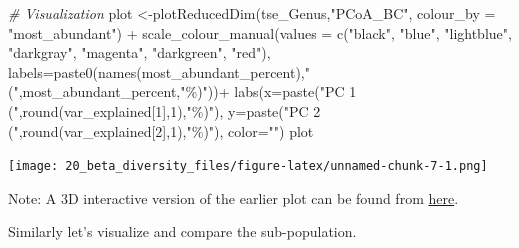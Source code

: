 \documentclass[
]{book}
\newenvironment{Shaded}{\begin{snugshade}}{\end{snugshade}}
\newcommand{\AttributeTok}[1]{\textcolor[rgb]{0.77,0.63,0.00}{#1}}
\newcommand{\CommentTok}[1]{\textcolor[rgb]{0.56,0.35,0.01}{\textit{#1}}}
\newcommand{\DecValTok}[1]{\textcolor[rgb]{0.00,0.00,0.81}{#1}}
\newcommand{\FunctionTok}[1]{\textcolor[rgb]{0.00,0.00,0.00}{#1}}
\newcommand{\NormalTok}[1]{#1}
\newcommand{\OtherTok}[1]{\textcolor[rgb]{0.56,0.35,0.01}{#1}}
\newcommand{\SpecialCharTok}[1]{\textcolor[rgb]{0.00,0.00,0.00}{#1}}
\newcommand{\StringTok}[1]{\textcolor[rgb]{0.31,0.60,0.02}{#1}}
\begin{document}
\begin{Shaded}
\begin{Highlighting}[]
\CommentTok{\# Visualization}
\NormalTok{plot }\OtherTok{\textless{}{-}}\FunctionTok{plotReducedDim}\NormalTok{(tse\_Genus,}\StringTok{"PCoA\_BC"}\NormalTok{, }\AttributeTok{colour\_by =} \StringTok{"most\_abundant"}\NormalTok{) }\SpecialCharTok{+}
  \FunctionTok{scale\_colour\_manual}\NormalTok{(}\AttributeTok{values =} \FunctionTok{c}\NormalTok{(}\StringTok{"black"}\NormalTok{, }\StringTok{"blue"}\NormalTok{, }\StringTok{"lightblue"}\NormalTok{, }\StringTok{"darkgray"}\NormalTok{, }\StringTok{"magenta"}\NormalTok{, }\StringTok{"darkgreen"}\NormalTok{, }\StringTok{"red"}\NormalTok{),}
                      \AttributeTok{labels=}\FunctionTok{paste0}\NormalTok{(}\FunctionTok{names}\NormalTok{(most\_abundant\_percent),}\StringTok{"("}\NormalTok{,most\_abundant\_percent,}\StringTok{"\%)"}\NormalTok{))}\SpecialCharTok{+}
  \FunctionTok{labs}\NormalTok{(}\AttributeTok{x=}\FunctionTok{paste}\NormalTok{(}\StringTok{"PC 1 ("}\NormalTok{,}\FunctionTok{round}\NormalTok{(var\_explained[}\DecValTok{1}\NormalTok{],}\DecValTok{1}\NormalTok{),}\StringTok{"\%)"}\NormalTok{),}
       \AttributeTok{y=}\FunctionTok{paste}\NormalTok{(}\StringTok{"PC 2 ("}\NormalTok{,}\FunctionTok{round}\NormalTok{(var\_explained[}\DecValTok{2}\NormalTok{],}\DecValTok{1}\NormalTok{),}\StringTok{"\%)"}\NormalTok{),}
       \AttributeTok{color=}\StringTok{""}\NormalTok{)}
\NormalTok{plot}
\end{Highlighting}
\end{Shaded}

\texttt{[image: 20\_beta\_diversity\_files/figure-latex/unnamed-chunk-7-1.png]}

Note: A 3D interactive version of the earlier plot can be found from \href{https://microbiome.github.io/OMA/interactive-3d-plots.html}{here}.

Similarly let's visualize and compare the sub-population.
\end{document}
